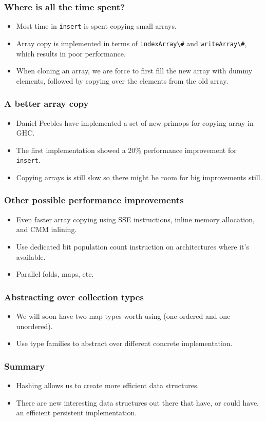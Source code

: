 \documentclass{beamer}
\begin{document}
\begin{frame}
  \frametitle{Where is all the time spent?}

  \begin{itemize}
  \item Most time in \lstinline!insert! is spent copying small arrays.
  \item Array copy is implemented in terms of \lstinline!indexArray\#!
    and \lstinline!writeArray\#!, which results in poor performance.
  \item When cloning an array, we are force to first fill the new
    array with dummy elements, followed by copying over the elements
    from the old array.
  \end{itemize}
\end{frame}

\begin{frame}
  \frametitle{A better array copy}

  \begin{itemize}
  \item Daniel Peebles have implemented a set of new primops for
    copying array in GHC.
  \item The first implementation showed a 20\% performance improvement
    for \lstinline!insert!.
  \item Copying arrays is still slow so there might be room for big
    improvements still.
  \end{itemize}
\end{frame}

\begin{frame}
  \frametitle{Other possible performance improvements}
  \begin{itemize}
  \item Even faster array copying using SSE instructions, inline
    memory allocation, and CMM inlining.
  \item Use dedicated bit population count instruction on
    architectures where it's available.
  \item Parallel folds, maps, etc.
  \end{itemize}
\end{frame}

\begin{frame}
  \frametitle{Abstracting over collection types}
  \begin{itemize}
  \item We will soon have two map types worth using (one ordered and one
    unordered).
  \item Use type families to abstract over different concrete
    implementation.
  \end{itemize}
\end{frame}

\begin{frame}
  \frametitle{Summary}
  \begin{itemize}
  \item Hashing allows us to create more efficient data structures.
  \item There are new interesting data structures out there that have,
    or could have, an efficient persistent implementation.
  \end{itemize}
\end{frame}
\end{document}
